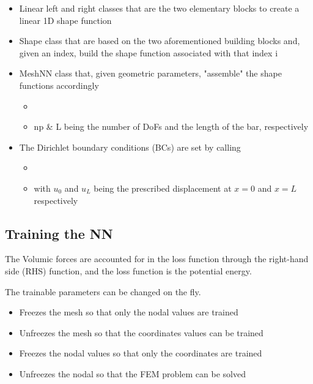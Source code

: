 \begin{itemize}
    \item Linear left and right classes that are the two elementary blocks to create a linear 1D shape function
   \item Shape class that are based on the two aforementioned building blocks and, given an index, build the shape function associated with that index i
   \item MeshNN class that, given geometric parameters, "assemble" the shape functions accordingly
    \begin{itemize}
        \item {}
        \item np \& L being the number of DoFs and the length of the bar, respectively
   \end{itemize}
   \item The Dirichlet boundary conditions (BCs) are set by calling
   \begin{itemize}
        \item {} 
        \item with $u_0$ and $u_L$ being the prescribed displacement at $x=0$ and $x=L$ respectively
        \end{itemize}
\end{itemize}

\subsection{Training the NN }

The Volumic forces are accounted for in the loss function through the right-hand side (RHS) function, and the loss function is the potential energy.

The trainable parameters can be changed on the fly. 
\begin{itemize}
    \item {} Freezes the mesh so that only the nodal values are trained
    \item {} Unfreezes the mesh so that the coordinates values can be trained
    \item {} Freezes the nodal values so that only the coordinates are trained
    \item {} Unfreezes the nodal so that the FEM problem can be solved
\end{itemize}


